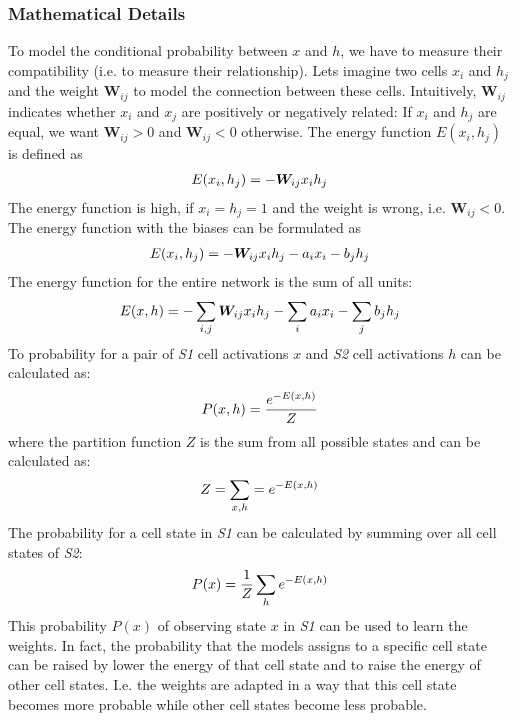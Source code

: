 \subsubsection{Mathematical Details}
To model the conditional probability between $x$ and $h$, we have to measure their compatibility (i.e. to measure their relationship).
Lets imagine two cells $x_i$ and $h_j$ and the weight $\boldsymbol{W}_{ij}$ to model the connection between these cells.
Intuitively, $\boldsymbol{W}_{ij}$ indicates whether $x_i$ and $x_j$ are positively or negatively related: If $x_i$ and $h_j$ are equal, we want $\boldsymbol{W}_{ij} > 0$ and $\boldsymbol{W}_{ij} < 0$ otherwise.
The energy function $E(x_i, h_j)$ is defined as
\begin{align}\eqlbl{l2_energy}
	E(x_i, h_j) = - \boldsymbol{W}_{ij}x_ih_j
\end{align}
The energy function is high, if $x_i=h_j=1$ and the weight is wrong, i.e. $\boldsymbol{W}_{ij} < 0$. The energy function with the biases can be formulated as
\begin{align}\eqlbl{l2_energy2}
	E(x_i, h_j) = - \boldsymbol{W}_{ij}x_ih_j - a_ix_i - b_jh_j
\end{align}
The energy function for the entire network is the sum of all units:
\begin{align}\eqlbl{l2_energy3}
	E(x, h) = - \sum_{i,j} \boldsymbol{W}_{ij}x_ih_j - \sum_ia_ix_i - \sum_jb_jh_j
\end{align}
To probability for a pair of \emph{S1} cell activations $x$ and \emph{S2} cell activations $h$ can be calculated as:
\begin{align}\eqlbl{l2_energy4}
	P(x,h) = \frac{e^{-E(x, h)}}{Z}
\end{align}
where the partition function $Z$ is the sum from all possible states and can be calculated as:
\begin{align}\eqlbl{l2_energy5}
	Z = \sum_{x,h} = e^{-E(x,h)}
\end{align}
The probability for a cell state in \emph{S1} can be calculated by summing over all cell states of \emph{S2}:
\begin{align}\eqlbl{l2_energy6}
	P(x) = \frac{1}{Z} \sum_{h}e^{-E(x,h)}
\end{align}
This probability $P(x)$ of observing state $x$ in \emph{S1} can be used to learn the weights. In fact, the probability that the models assigns to a specific cell state can be raised by lower the energy of that cell state and to raise the energy of other cell states. I.e. the weights are adapted in a way that this cell state becomes more probable while other cell states become less probable.
